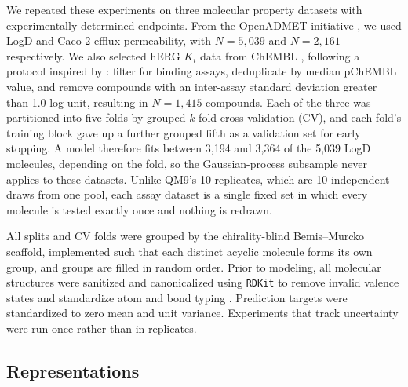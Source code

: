 We repeated these experiments on three molecular property datasets with experimentally determined endpoints. From the OpenADMET initiative \citep{openadmet}, we used LogD and Caco-2 efflux permeability, with $N = 5{,}039$ and $N = 2{,}161$ respectively. We also selected hERG $K_i$ data from ChEMBL \citep{Zdrazil2023}, following a protocol inspired by \citet{landrum2024}: filter for binding assays, deduplicate by median pChEMBL value, and remove compounds with an inter-assay standard deviation greater than 1.0 log unit, resulting in $N = 1{,}415$ compounds. Each of the three was partitioned into five folds by grouped $k$-fold cross-validation (CV), and each fold's training block gave up a further grouped fifth as a validation set for early stopping. A model therefore fits between 3,194 and 3,364 of the 5,039 LogD molecules, depending on the fold, so the Gaussian-process subsample never applies to these datasets. Unlike QM9's 10 replicates, which are 10 independent draws from one pool, each assay dataset is a single fixed set in which every molecule is tested exactly once and nothing is redrawn.

All splits and CV folds were grouped by the chirality-blind Bemis--Murcko scaffold, implemented such that each distinct acyclic molecule forms its own group, and groups are filled in random order. Prior to modeling, all molecular structures were sanitized and canonicalized using \texttt{RDKit} to remove invalid valence states and standardize atom and bond typing \citep{rdkit}. Prediction targets were standardized to zero mean and unit variance. Experiments that track uncertainty were run once rather than in replicates.

\subsection{Representations}

